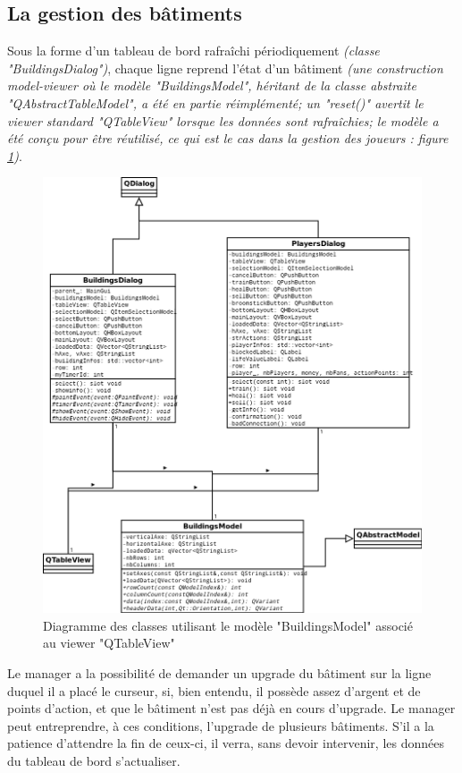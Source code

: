 \documentclass[a4paper,titlepage]{scrreprt}
\begin{document}
\subsection{La gestion des bâtiments}
Sous la forme d'un tableau de bord rafraîchi périodiquement \emph{(classe "BuildingsDialog")},
chaque ligne reprend l'état d'un bâtiment \emph{(une construction model-viewer
où le modèle "BuildingsModel", héritant de la classe abstraite "QAbstractTableModel", a été en partie réimplémenté;
un "reset()" avertit le viewer standard "QTableView" lorsque les données sont rafraîchies;
le modèle a été conçu pour être réutilisé, ce qui est le cas dans la gestion des joueurs : figure \ref{tableView})}.
    \begin{figure}[H]
    \center
    \includegraphics[scale=0.4]{uml/class/tableView.png}
    \caption{Diagramme des classes utilisant le modèle "BuildingsModel" associé au viewer "QTableView"}\label{tableView}
    \end{figure}
Le manager a la possibilité de demander un upgrade du bâtiment sur la ligne duquel
il a placé le curseur, si, bien entendu, il possède assez d'argent et de points d'action,
et que le bâtiment n'est pas déjà en cours d'upgrade.
Le manager peut entreprendre, à ces conditions, l'upgrade de plusieurs bâtiments.
S'il a la patience d'attendre la fin de ceux-ci, il verra,
sans devoir intervenir, les données du tableau de bord s'actualiser.
\end{document}
